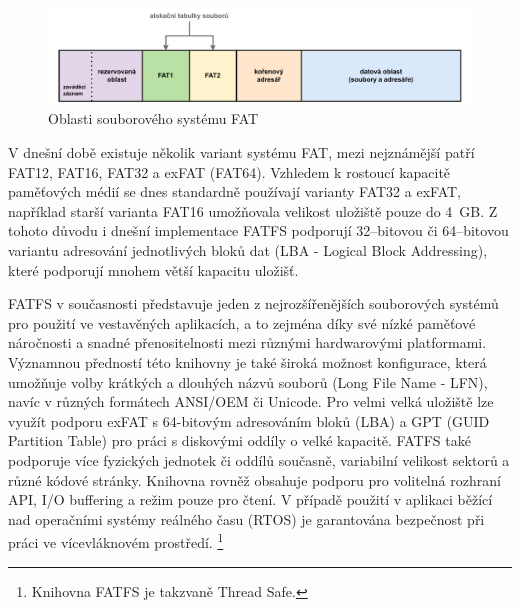 \begin{figure}[h]
    \centering
    \includegraphics[width=1.00\textwidth]{obrazky-figures/fatfs_structure-cz.pdf}
    
    \caption{Oblasti souborového systému FAT \cite{recoverit_fat_filesystem}}
    \label{fig:fatfs-structure}
\end{figure}

V dnešní době existuje několik variant systému FAT, mezi nejznámější patří FAT12, FAT16, FAT32 a exFAT (FAT64). Vzhledem k rostoucí kapacitě paměťových médií se dnes standardně používají varianty FAT32 a exFAT, například starší varianta FAT16 umožňovala velikost uložiště pouze do 4~GB. Z tohoto důvodu i dnešní implementace FATFS podporují 32--bitovou či 64--bitovou variantu adresování jednotlivých bloků dat (LBA - Logical Block Addressing), které podporují mnohem větší kapacitu uložišť. \cite{elm_fat_filesystem_app_note}

FATFS v současnosti představuje jeden z nejrozšířenějších souborových systémů pro použití ve vestavěných aplikacích, a to zejména díky své nízké paměťové náročnosti a snadné přenositelnosti mezi různými hardwarovými platformami. Významnou předností této knihovny je také široká možnost konfigurace, která umožňuje volby krátkých a dlouhých názvů souborů (Long File Name - LFN), navíc v různých formátech ANSI/OEM či Unicode. Pro velmi velká uložiště lze využít podporu exFAT s 64-bitovým adresováním bloků (LBA) a GPT (GUID Partition Table) pro práci s diskovými oddíly o velké kapacitě. FATFS také podporuje více fyzických jednotek či oddílů současně, variabilní velikost sektorů a různé kódové stránky. Knihovna rovněž obsahuje podporu pro volitelná rozhraní API, I/O buffering a režim pouze pro čtení. V případě použití v aplikaci běžící nad operačními systémy reálného času (RTOS) je garantována bezpečnost při práci ve vícevláknovém prostředí. \footnote{Knihovna FATFS je takzvaně Thread Safe.} \cite{elm_fat_filesystem_module}



